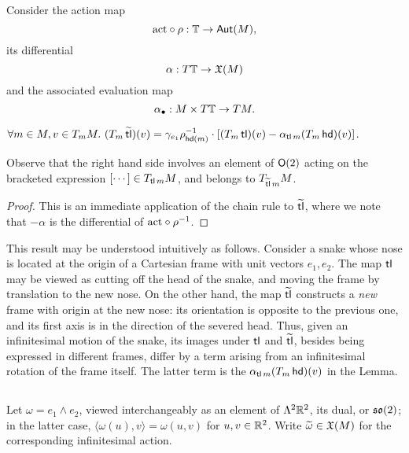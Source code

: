 \subsection{}
Consider the action map
\[  \mathrm{act} \circ \rho : {\mathbb{T}}  \to \operatorname{\mathsf{Aut}}(M), \]
its differential
\[  \alpha : T{\mathbb{T}} \to \mathfrak{X}(M) \]
and the associated evaluation map
\[  \alpha_\bullet : M\times T{\mathbb{T}} \to TM. \]
\begin{lem}\label{lem:ttl-diff}
$\forall m\in M, v \in T_mM.\
(T_m \operatorname{\widetilde{\operatorname{\mathsf{tl}}}})(v) = \gamma_{e_1} \rho_{\operatorname{\mathsf{hd}}(m)}^{-1} \cdot [ (T_m \operatorname{\mathsf{tl}})(v) - \alpha_{\operatorname{\mathsf{tl}} m} (T_m \operatorname{\mathsf{hd}})(v) ]$.
\end{lem}                               
Observe that the right hand side involves an element of $\mathsf{O}(2)$ acting on the bracketed expression
$[\cdots] \in T_{\operatorname{\mathsf{tl}} m} M$,
and belongs to $T_{\operatorname{\widetilde{\operatorname{\mathsf{tl}}}} m}M$. 

\begin{proof} This is an immediate application of the chain rule to $\operatorname{\widetilde{\operatorname{\mathsf{tl}}}}$, where we note
        that $-\alpha$ is the differential of $\mathrm{act} \circ \rho^{-1}$.
\end{proof}


This result may be understood intuitively as follows. Consider a snake whose nose
is located at the origin of a Cartesian frame with unit vectors $e_1,e_2$. The map $\operatorname{\mathsf{tl}}$
may be viewed as cutting off the head of the snake, and moving the frame by translation
to the new nose. On the other hand, the map $\operatorname{\widetilde{\operatorname{\mathsf{tl}}}}$ constructs a \emph{new} frame with origin at
the new nose: its orientation is opposite to the previous one, and its first axis is
in the direction of the severed head. Thus, given an infinitesimal motion of the snake,
its images under $\operatorname{\mathsf{tl}}$ and $\operatorname{\widetilde{\operatorname{\mathsf{tl}}}}$, besides being expressed in different frames, differ by
a term arising from an infinitesimal rotation of the frame itself. The latter term
is the $\alpha_{\operatorname{\mathsf{tl}} m} (T_m \operatorname{\mathsf{hd}})(v)$ in the Lemma.

\subsection{}
Let $\omega = e_1\wedge e_2$, viewed interchangeably as an element of $\Lambda^2{\mathbb{R}}^2$, its dual, or $\mathfrak{so}(2)$;
in the latter case, $\langle\omega(u),v\rangle = \omega(u,v)$ for $u,v \in{\mathbb{R}}^2$. Write $\widetilde{\omega}\in\mathfrak{X}(M)$ for the 
corresponding infinitesimal action. 

